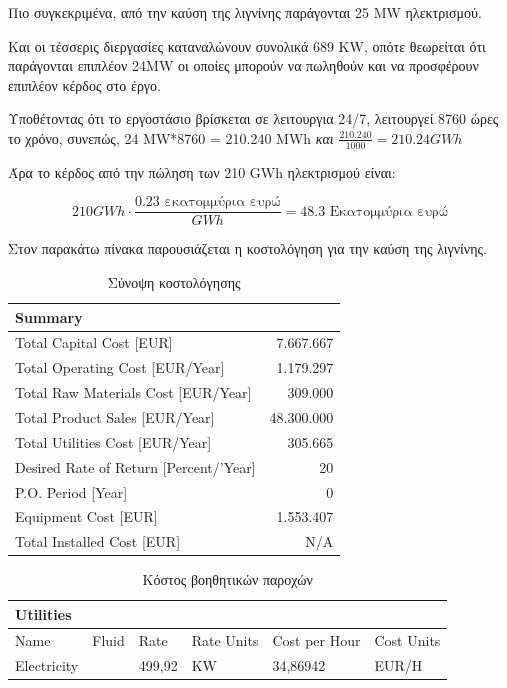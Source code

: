 \documentclass[11pt]{article}
\begin{document}
Πιο συγκεκριμένα, από την καύση της λιγνίνης παράγονται 25 MW
ηλεκτρισμού.

Και οι τέσσερις διεργασίες καταναλώνουν συνολικά 689 KW, οπότε θεωρείται
ότι παράγονται επιπλέον 24MW οι οποίες μπορούν να πωληθούν και να
προσφέρουν επιπλέον κέρδος στο έργο.

Υποθέτοντας ότι το εργοστάσιο βρίσκεται σε λειτουργια 24/7, λειτουργεί
8760 ώρες το χρόνο, συνεπώς, 24 MW*8760 = 210.240 MWh
\emph{και} \(\frac{210.240}{1000} =  210.24 GWh\)

Άρα το κέρδος από την πώληση των 210 GWh ηλεκτρισμού είναι:

\[ 210 GWh \cdot \frac{0.23 \text{ εκατομμύρια ευρώ}}{GWh} = 48.3 \text{ Εκατομμύρια ευρώ} \]

Στον παρακάτω πίνακα παρουσιάζεται η κοστολόγηση για την καύση της λιγνίνης.

\begin{table}[htbp]
\caption{Σύνοψη κοστολόγησης}
\centering
\begin{tabular}{lr}
Summary & \\
\hline
Total Capital Cost [EUR] & 7.667.667\\
Total Operating Cost [EUR/Year] & 1.179.297\\
Total Raw Materials Cost [EUR/Year] & 309.000\\
Total Product Sales [EUR/Year] & 48.300.000\\
Total Utilities Cost [EUR/Year] & 305.665\\
Desired Rate of Return [Percent/'Year] & 20\\
P.O. Period [Year] & 0\\
Equipment Cost [EUR] & 1.553.407\\
Total Installed Cost [EUR] & N/A\\
\end{tabular}
\end{table}

\begin{table}[htbp]
\caption{Κόστος βοηθητικών παροχών}
\centering
\begin{tabular}{llllll}
Utilities &  &  &  &  & \\
\hline
Name & Fluid & Rate & Rate Units & Cost per Hour & Cost Units\\
Electricity &   & 499,92 & KW & 34,86942 & EUR/H\\
\end{tabular}
\end{table}
\end{document}
